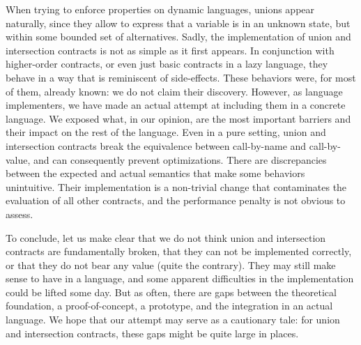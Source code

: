 \documentclass[sigplan,10pt,review,anonymous]{acmart}
\begin{document}


When trying to enforce properties on dynamic languages, unions appear naturally,
since they allow to express that a variable is in an unknown state, but within
some bounded set of alternatives.
Sadly, the implementation of union and intersection contracts is not as simple as
it first appears. In conjunction with higher-order contracts, or even just basic
contracts in a lazy language, they behave in a way that is reminiscent of
side-effects. These behaviors were, for most of them, already known: we do not
claim their discovery. However, as language implementers, we have made an actual
attempt at including them in a concrete language. We exposed what, in our
opinion, are the most important barriers and their impact on the rest of the
language. Even in a pure setting, union and intersection contracts break the
equivalence between call-by-name and call-by-value, and can consequently prevent
optimizations. There are discrepancies between the expected and actual semantics
that make some behaviors unintuitive. Their implementation is a non-trivial
change that contaminates the evaluation of all other contracts, and the
performance penalty is not obvious to assess.

To conclude, let us make clear that we do not think union and intersection
contracts are fundamentally broken, that they can not be implemented correctly,
or that they do not bear any value (quite the contrary). They may still make
sense to have in a language, and some apparent difficulties in the
implementation could be lifted some day. But as often, there are gaps between
the theoretical foundation, a proof-of-concept, a prototype, and the integration
in an actual language. We hope that our attempt may serve as a cautionary tale:
for union and intersection contracts, these gaps might be quite large in places.


\end{document}
